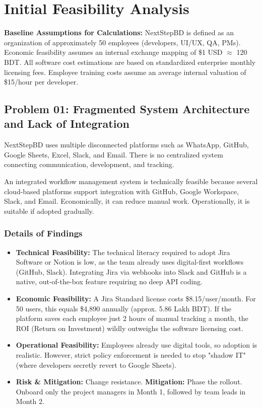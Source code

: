 \documentclass[12pt,a4paper]{report}
\begin{document}
\section{Initial Feasibility Analysis}

\textbf{Baseline Assumptions for Calculations:} NextStepBD is defined as an organization of approximately 50 employees (developers, UI/UX, QA, PMs). Economic feasibility assumes an internal exchange mapping of \$1 USD $\approx$ 120 BDT. All software cost estimations are based on standardized enterprise monthly licensing fees. Employee training costs assume an average internal valuation of \$15/hour per developer.

\subsection{Problem 01: Fragmented System Architecture and Lack of Integration}

\begin{problemBox}
NextStepBD uses multiple disconnected platforms such as WhatsApp, GitHub, Google Sheets, Excel, Slack, and Email. There is no centralized system connecting communication, development, and tracking.
\end{problemBox}

\begin{summaryBox}
An integrated workflow management system is technically feasible because several cloud-based platforms support integration with GitHub, Google Workspace, Slack, and Email. Economically, it can reduce manual work. Operationally, it is suitable if adopted gradually.
\end{summaryBox}

\subsubsection{Details of Findings}

\begin{itemize}[leftmargin=*]
    \item \textbf{Technical Feasibility:} The technical literacy required to adopt Jira Software or Notion is low, as the team already uses digital-first workflows (GitHub, Slack). Integrating Jira via webhooks into Slack and GitHub is a native, out-of-the-box feature requiring no deep API coding.
    \item \textbf{Economic Feasibility:} A Jira Standard license costs \$8.15/user/month. For 50 users, this equals \$4,890 annually (approx. 5.86 Lakh BDT). If the platform saves each employee just 2 hours of manual tracking a month, the ROI (Return on Investment) wildly outweighs the software licensing cost.
    \item \textbf{Operational Feasibility:} Employees already use digital tools, so adoption is realistic. However, strict policy enforcement is needed to stop "shadow IT" (where developers secretly revert to Google Sheets).
    \item \textbf{Risk \& Mitigation:} Change resistance. \textbf{Mitigation:} Phase the rollout. Onboard only the project managers in Month 1, followed by team leads in Month 2.
\end{itemize}
\end{document}
